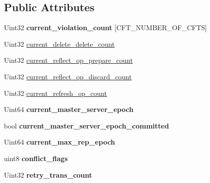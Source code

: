 \subsection*{Public Attributes}
\begin{DoxyCompactItemize}
\item 
\mbox{\label{structst__ndb__slave__state_aded9439f4072d94d684315b3344e2f5d}} 
Uint32 {\bfseries current\+\_\+violation\+\_\+count} \mbox{[}C\+F\+T\+\_\+\+N\+U\+M\+B\+E\+R\+\_\+\+O\+F\+\_\+\+C\+F\+TS\mbox{]}
\item 
Uint32 \mbox{\hyperlink{structst__ndb__slave__state_a19c4a75aeb841aebb76d27b362969d3c}{current\+\_\+delete\+\_\+delete\+\_\+count}}
\item 
Uint32 \mbox{\hyperlink{structst__ndb__slave__state_a8ce32f561db5905aeb0c59419c0dcc4f}{current\+\_\+reflect\+\_\+op\+\_\+prepare\+\_\+count}}
\item 
Uint32 \mbox{\hyperlink{structst__ndb__slave__state_ab282a2a924875f1cfd7548c47795ea0a}{current\+\_\+reflect\+\_\+op\+\_\+discard\+\_\+count}}
\item 
Uint32 \mbox{\hyperlink{structst__ndb__slave__state_a03e38b1dcbe407f62fff243162a1042b}{current\+\_\+refresh\+\_\+op\+\_\+count}}
\item 
\mbox{\label{structst__ndb__slave__state_aff94d822023f83fc978b0352eb6ef2ce}} 
Uint64 {\bfseries current\+\_\+master\+\_\+server\+\_\+epoch}
\item 
\mbox{\label{structst__ndb__slave__state_a9a528a6969e16c3a1c140303e891f989}} 
bool {\bfseries current\+\_\+master\+\_\+server\+\_\+epoch\+\_\+committed}
\item 
\mbox{\label{structst__ndb__slave__state_aaf8c2dfa20cd6234f5a2957ee78e1a5a}} 
Uint64 {\bfseries current\+\_\+max\+\_\+rep\+\_\+epoch}
\item 
\mbox{\label{structst__ndb__slave__state_a33ed23cae841b84162a96fcdd3804be9}} 
uint8 {\bfseries conflict\+\_\+flags}
\item 
\mbox{\label{structst__ndb__slave__state_a43f1b8fa8386a931c6d0d3a3f4fd8cad}} 
Uint32 {\bfseries retry\+\_\+trans\+\_\+count}
\item 

\end{DoxyCompactItemize}
